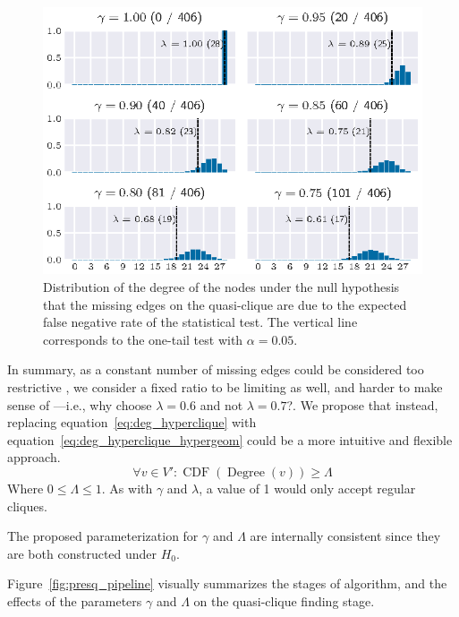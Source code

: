 \begin{figure}[ht]
    \centering
    \includegraphics{images/5_presq/hypergeom}
    \caption[Distribution of the degree of the nodes under the assumption that missing edges
    are due to the expected false negative rate.]{
    Distribution of the degree of the nodes under the null hypothesis that the 
    missing edges on the quasi-clique are due to the expected false negative rate of the
    statistical test.
    The vertical line corresponds to the one-tail test with $\alpha = 0.05$.}
    \label{fig:hypergeom_sf}
\end{figure}

In summary, as a constant number of missing edges could be considered
too restrictive \cite{brunato2007effectively}, we consider a fixed ratio to be
limiting as well, and harder to make sense of ---i.e., why choose $\lambda = 0.6$
and not $\lambda = 0.7$?.
We propose that instead, replacing equation~\ref{eq:deg_hyperclique}
with equation~\ref{eq:deg_hyperclique_hypergeom} could be a more intuitive and
flexible approach.
\begin{equation}
    \forall v \in V': \operatorname{CDF}(\operatorname{Degree}(v)) \ge \Lambda
    \label{eq:deg_hyperclique_hypergeom}
\end{equation}
Where $0 \le \Lambda \le 1$. As with $\gamma$ and $\lambda$, a value of 1 would only accept
regular cliques.

The proposed parameterization for $\gamma$ and $\Lambda$ are internally consistent
since they are both constructed under $H_0$.

Figure~\ref{fig:presq_pipeline} visually summarizes the stages of \PresQ algorithm,
and the effects of the parameters $\gamma$ and $\Lambda$ on the quasi-clique finding stage.


